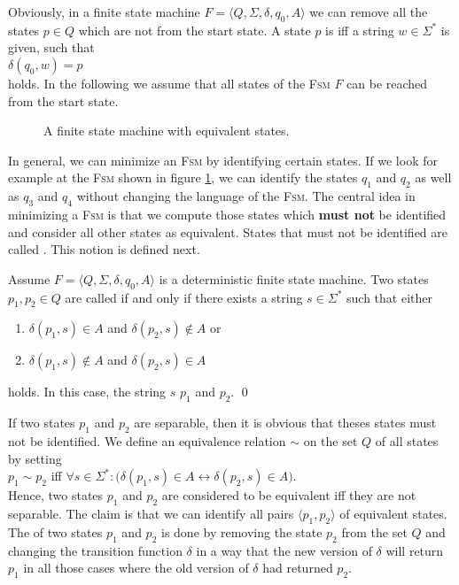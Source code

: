 Obviously, in a finite state machine 
$F = \langle Q, \Sigma, \delta, q_0, A \rangle$ we can remove all the states $p \in Q$ which are not
 from the start state.  A state $p$ is  iff 
a string $w \in \Sigma^*$ is given, such that
\\[0.2cm]
\hspace*{1.3cm}
$\delta(q_0, w) = p$
\\[0.2cm]
holds.  In the following we assume that all states of the \textsc{Fsm} $F$ can be reached
from the start state. 


\begin{figure}[!ht]
  \centering
   \caption{A finite state machine with equivalent states.}
  \label{fig:nicht-gleichwertig.dot}
\end{figure}

In general, we can minimize an \textsc{Fsm} by identifying certain states.   
If we look for example at the \textsc{Fsm} shown in figure \ref{fig:nicht-gleichwertig.dot}, we can identify
the states $q_1$ and $q_2$ as well as $q_3$ and $q_4$ without changing the language of the \textsc{Fsm}. 
The central idea in minimizing a \textsc{Fsm} is that we compute those states which \textbf{must not} be
identified and consider all other states as equivalent.  States that must not be identified are called
.  This notion is defined next.

\begin{Definition}
Assume $F = \langle Q, \Sigma, \delta, q_0, A \rangle$ is a deterministic finite state machine.
Two states $p_1,p_2 \in Q$ are called   if and only if there exists a string 
$s \in \Sigma^*$ such that either
\begin{enumerate}
\item $\delta(p_1,s) \in    A$ and $\delta(p_2,s) \notin A$ or
\item $\delta(p_1,s) \notin A$ and $\delta(p_2,s) \in    A$
\end{enumerate}
holds.  In this case, the string $s$   $p_1$ and $p_2$. \qed
\end{Definition}
If two states $p_1$ and $p_2$ are separable, then it is obvious that theses states must not be identified.
We define an equivalence relation $\sim$ on the set $Q$ of all states by setting
\\[0.2cm]
\hspace*{1.3cm}
$p_1 \sim p_2$ \quad iff \quad 
$\forall s \in \Sigma^*:\bigl(\delta(p_1,s) \in A \leftrightarrow \delta(p_2,s) \in A\bigr)$.
\\[0.2cm]
Hence, two states $p_1$ and $p_2$ are considered to be equivalent iff they are not separable.   
The claim is that we can identify all pairs $\langle p_1, p_2\rangle$ of equivalent states.  The
  
of two states $p_1$ and $p_2$ is done by removing the state $p_2$ from the set $Q$ and changing the transition
function $\delta$ in a way that the new version of $\delta$ will return $p_1$ in all those cases where the old
version of $\delta$ had returned $p_2$. 


